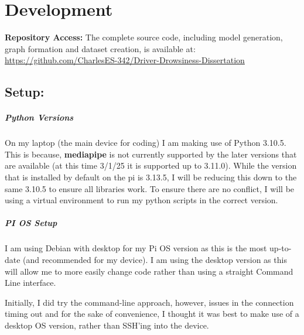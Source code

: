 \chapter*{Development}

\begin{mdframed}[style=takeawaybox]
\textbf{Repository Access:} The complete source code, including model generation, graph formation and dataset creation, is available at: \url{https://github.com/CharlesES-342/Driver-Drowsiness-Dissertation}
\end{mdframed}

\section{Setup:}
\paragraph{Python Versions}
On my laptop (the main device for coding) I am making use of Python 3.10.5. This is because, \textbf{mediapipe} is not currently supported by the
later versions that are available (at this time 3/1/25 it is supported up to 3.11.0). While the version that is installed by default on
the pi is 3.13.5, I will be reducing this down to the same 3.10.5 to ensure all libraries work. To ensure there are no conflict, I will
be using a virtual environment to run my python scripts in the correct version.

\paragraph{PI OS Setup}
I am using Debian with desktop for my Pi OS version as this is the most up-to-date (and recommended for my device). I am using the desktop
version as this will allow me to more easily change code rather than using a straight Command Line interface.

Initially, I did try the command-line approach, however, issues in the connection timing out and for the sake of convenience, I thought
it was best to make use of a desktop OS version, rather than SSH'ing into the device.

